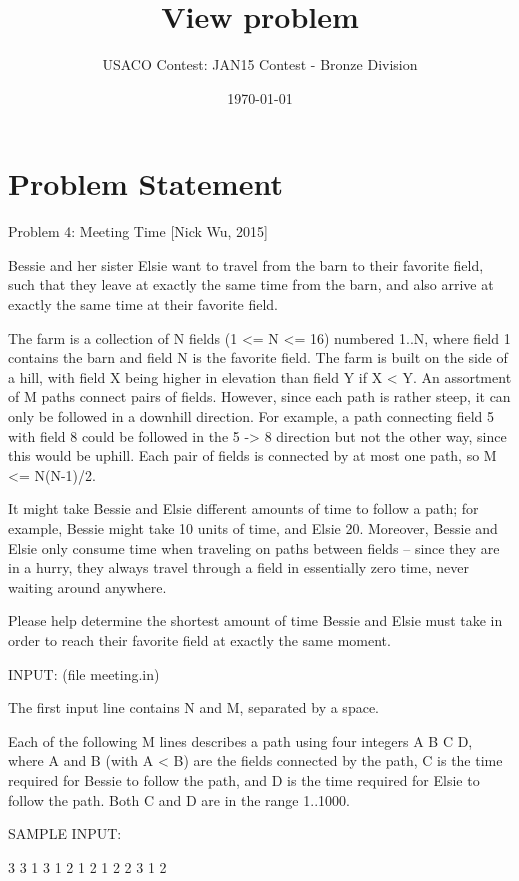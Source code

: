 \documentclass[12pt]{article}
\title{View problem}
\author{USACO Contest: JAN15 Contest - Bronze Division}
\date{\today}
\begin{document}
\maketitle

\section*{Problem Statement}

Problem 4: Meeting Time [Nick Wu, 2015]

Bessie and her sister Elsie want to travel from the barn to their
favorite field, such that they leave at exactly the same time from the
barn, and also arrive at exactly the same time at their favorite
field.

The farm is a collection of N fields (1 <= N <= 16) numbered 1..N,
where field 1 contains the barn and field N is the favorite field.
The farm is built on the side of a hill, with field X being higher in
elevation than field Y if X < Y.  An assortment of M paths connect
pairs of fields.  However, since each path is rather steep, it can
only be followed in a downhill direction. For example, a path
connecting field 5 with field 8 could be followed in the 5 -> 8
direction but not the other way, since this would be uphill.  Each
pair of fields is connected by at most one path, so M <= N(N-1)/2.

It might take Bessie and Elsie different amounts of time to follow a
path; for example, Bessie might take 10 units of time, and Elsie 20.
Moreover, Bessie and Elsie only consume time when traveling on paths
between fields -- since they are in a hurry, they always travel
through a field in essentially zero time, never waiting around
anywhere.

Please help determine the shortest amount of time Bessie and Elsie
must take in order to reach their favorite field at exactly the same
moment.

INPUT: (file meeting.in)

The first input line contains N and M, separated by a space.

Each of the following M lines describes a path using four integers A B
C D, where A and B (with A < B) are the fields connected by the path,
C is the time required for Bessie to follow the path, and D is the
time required for Elsie to follow the path.  Both C and D are in the
range 1..1000.

SAMPLE INPUT:

3 3
1 3 1 2
1 2 1 2
2 3 1 2
\end{document}
